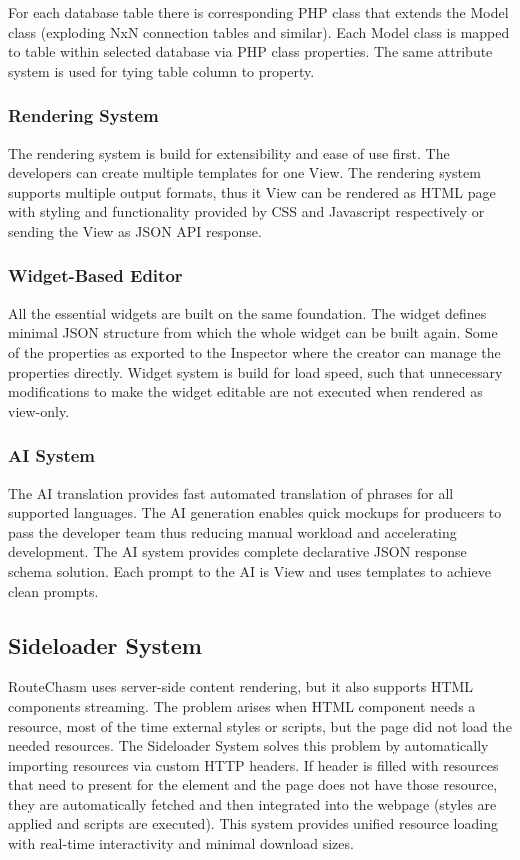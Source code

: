 For each database table there is corresponding PHP class that extends the Model class
(exploding NxN connection tables and similar).
Each Model class is mapped to table within selected database via PHP class properties.
The same attribute system is used for tying table column to property.

\subsubsection{Rendering System}
The rendering system is build for extensibility and ease of use first.
The developers can create multiple templates for one View.
The rendering system supports multiple output formats, thus it View can be rendered as HTML page with styling
and functionality provided by CSS and Javascript respectively or sending the View as JSON API response.

\subsubsection{Widget-Based Editor}
All the essential widgets are built on the same foundation.
The widget defines minimal JSON structure from which the whole widget can be built again.
Some of the properties as exported to the Inspector where the creator can manage the properties directly.
Widget system is build for load speed, such that unnecessary modifications to make the widget editable are not executed
when rendered as view-only.

\subsubsection{AI System}
The AI translation provides fast automated translation of phrases for all supported languages.
The AI generation enables quick mockups for producers to pass the developer team thus reducing manual workload
and accelerating development.
The AI system provides complete declarative JSON response schema solution.
Each prompt to the AI is View and uses templates to achieve clean prompts.

\subsection{Sideloader System}\label{subsec:architecture-sideloader}
RouteChasm uses server-side content rendering, but it also supports HTML components streaming.
The problem arises when HTML component needs a resource, most of the time external styles or scripts, but the page
did not load the needed resources.
The Sideloader System solves this problem by automatically importing resources via custom HTTP headers.
If header is filled with resources that need to present for the element and the page does not have those resource,
they are automatically fetched and then integrated into the webpage (styles are applied and scripts are executed).
This system provides unified resource loading with real-time interactivity and minimal download sizes.


